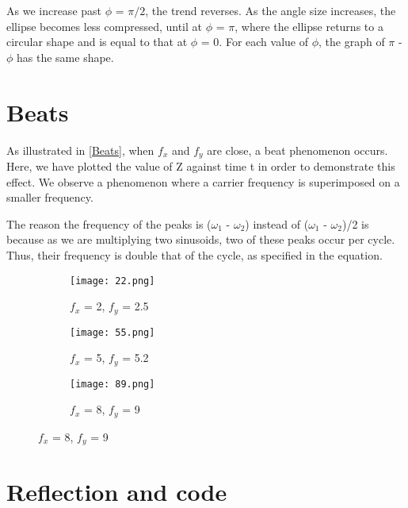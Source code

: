 \documentclass{article}
\begin{document}
As we increase past $\phi$ = $\pi/2$, the trend reverses. As the angle size increases, the ellipse becomes less compressed, until at $\phi$ = $\pi$, where the ellipse returns to a circular shape and is equal to that at $\phi$ = 0. 
For each value of $\phi$, the graph of $\pi$ - $\phi$ has the same shape. 

\section{Beats}

As illustrated in \ref{Beats}, when $f_x$ and $f_y$ are close, a beat phenomenon occurs. Here, we have plotted the value of Z against time t in order to demonstrate this effect. We observe a phenomenon where a carrier frequency is superimposed on a smaller frequency. 

The reason the frequency of the peaks is ($\omega_1$ - $\omega_2$) instead of ($\omega_1$ - $\omega_2$)/2 is because as we are multiplying two sinusoids, two of these peaks occur per cycle. Thus, their frequency is double that of the cycle, as specified in the equation.  

\begin{figure}
    \caption{Examples of Beat Phenomenon}
    \label{Beats}

\begin{subfigure}{0.5\textwidth}
    \centering
    \texttt{[image: 22.png]}
    \caption{$f_x$ = 2, $f_y$ =  2.5}
    \label{fig:1}
\end{subfigure}
\begin{subfigure}{0.5\textwidth}
    \centering
    \texttt{[image: 55.png]}
    \caption{$f_x$ = 5, $f_y$ =  5.2}
    \label{fig:2}
\end{subfigure}
\begin{subfigure}{0.5\textwidth}
    \centering
    \texttt{[image: 89.png]}
    \caption{$f_x$ = 8, $f_y$ =  9}
    \label{fig:2}
\end{subfigure}

\end{figure}

\section{Reflection and code}
\end{document}
